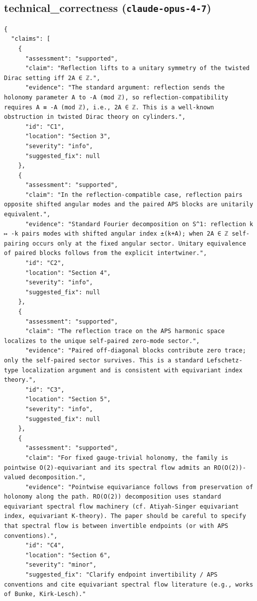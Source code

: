 \documentclass[11pt]{article}
\begin{document}
\subsection*{technical_correctness (\texttt{claude-opus-4-7})}
\begin{verbatim}
{
  "claims": [
    {
      "assessment": "supported",
      "claim": "Reflection lifts to a unitary symmetry of the twisted Dirac setting iff 2A ∈ ℤ.",
      "evidence": "The standard argument: reflection sends the holonomy parameter A to -A (mod ℤ), so reflection-compatibility requires A ≡ -A (mod ℤ), i.e., 2A ∈ ℤ. This is a well-known obstruction in twisted Dirac theory on cylinders.",
      "id": "C1",
      "location": "Section 3",
      "severity": "info",
      "suggested_fix": null
    },
    {
      "assessment": "supported",
      "claim": "In the reflection-compatible case, reflection pairs opposite shifted angular modes and the paired APS blocks are unitarily equivalent.",
      "evidence": "Standard Fourier decomposition on S^1: reflection k ↦ -k pairs modes with shifted angular index ±(k+A); when 2A ∈ ℤ self-pairing occurs only at the fixed angular sector. Unitary equivalence of paired blocks follows from the explicit intertwiner.",
      "id": "C2",
      "location": "Section 4",
      "severity": "info",
      "suggested_fix": null
    },
    {
      "assessment": "supported",
      "claim": "The reflection trace on the APS harmonic space localizes to the unique self-paired zero-mode sector.",
      "evidence": "Paired off-diagonal blocks contribute zero trace; only the self-paired sector survives. This is a standard Lefschetz-type localization argument and is consistent with equivariant index theory.",
      "id": "C3",
      "location": "Section 5",
      "severity": "info",
      "suggested_fix": null
    },
    {
      "assessment": "supported",
      "claim": "For fixed gauge-trivial holonomy, the family is pointwise O(2)-equivariant and its spectral flow admits an RO(O(2))-valued decomposition.",
      "evidence": "Pointwise equivariance follows from preservation of holonomy along the path. RO(O(2)) decomposition uses standard equivariant spectral flow machinery (cf. Atiyah-Singer equivariant index, equivariant K-theory). The paper should be careful to specify that spectral flow is between invertible endpoints (or with APS conventions).",
      "id": "C4",
      "location": "Section 6",
      "severity": "minor",
      "suggested_fix": "Clarify endpoint invertibility / APS conventions and cite equivariant spectral flow literature (e.g., works of Bunke, Kirk-Lesch)."

\end{verbatim}
\end{document}
